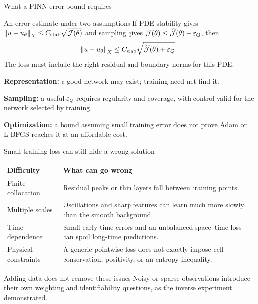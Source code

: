 \renewcommand{\slideid}{L3-C03}
\begin{frame}[c]{What a PINN error bound requires}
\small
\begin{block}{An error estimate under two assumptions}
If PDE stability gives $\left\lVert u-u_\theta\right\rVert_X\le C_{\rm stab}\sqrt{\mathcal{J}(\theta)}$
and sampling gives $\mathcal{J}(\theta)\le\widehat{\mathcal{J}}(\theta)+\varepsilon_Q$, then
\[
 \left\lVert u-u_\theta\right\rVert_X\le
 C_{\rm stab}\sqrt{\widehat{\mathcal{J}}(\theta)+\varepsilon_Q}.
\]
The loss must include the right residual and boundary norms for this PDE.
\end{block}
\begin{slideitems}
\item \textbf{Representation:} a good network may exist; training need not find it.
\item \textbf{Sampling:} a useful $\varepsilon_Q$ requires regularity and coverage,
with control valid for the network selected by training.
\item \textbf{Optimization:} a bound assuming small training error does not
prove Adam or L-BFGS reaches it at an affordable cost.
\end{slideitems}
\end{frame}

\renewcommand{\slideid}{L3-C05}
\begin{frame}[c]{Small training loss can still hide a wrong solution}
\small
\renewcommand{\arraystretch}{1.35}
\begin{tabular}{@{}>{\raggedright\arraybackslash}p{}>{\raggedright\arraybackslash}p{}@{}}
\toprule
Difficulty & What can go wrong\\
\midrule
Finite collocation & Residual peaks or thin layers fall between training points.\\
Multiple scales & Oscillations and sharp features can learn much more slowly
than the smooth background.\\
Time dependence & Small early-time errors and an unbalanced space--time loss
can spoil long-time predictions.\\
Physical constraints & A generic pointwise loss does not exactly impose cell
conservation, positivity, or an entropy inequality.\\
\bottomrule
\end{tabular}
\begin{block}{Adding data does not remove these issues}
Noisy or sparse observations introduce their own weighting and
identifiability questions, as the inverse experiment demonstrated.
\end{block}
\end{frame}

